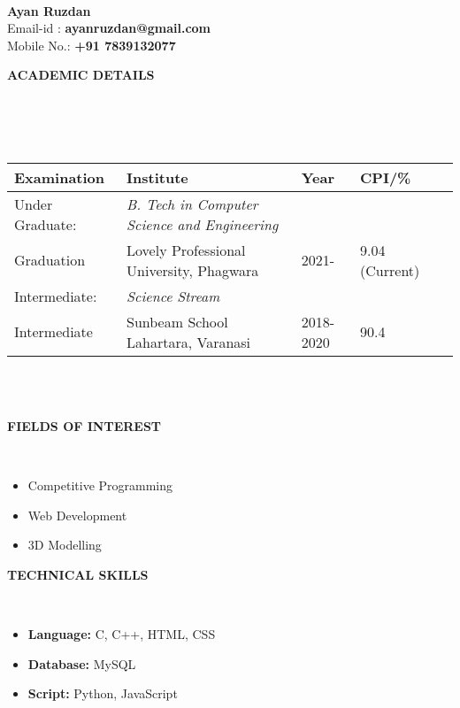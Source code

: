 \documentclass[a4paper,10pt]{article}
\newcommand{\lsep}{-0.5cm}
\newcommand{\resheading}[1]{{\small \colorbox{mygrey}{\begin{minipage}{0.975\textwidth}{\textbf{#1 \vphantom{p\^{E}}}}\end{minipage}}}}
\begin{document}
\hspace{0.5cm}\\[-0.2cm]

\textbf{Ayan Ruzdan} \\
\indent Email-id : \textbf{ayanruzdan@gmail.com} \\
\indent Mobile No.: \textbf{+91 7839132077} \\

\resheading{\textbf{ACADEMIC DETAILS} }\\[\lsep]
\\ \\
\indent \begin{tabular}{ l @{\hskip 0.15in} l @{\hskip 0.15in} l @{\hskip 0.15in} l @{\hskip 0.15in} l }
  \hline
  \textbf{Examination} & \textbf{Institute}                       & \textbf{Year} & \textbf{CPI/\%} \\
  \hline
  Under Graduate:\,\,  & \textit{B. Tech in Computer Science and Engineering}                                   \\
  Graduation           & Lovely Professional University, Phagwara  & 2021-       & 9.04 (Current)  \\
  Intermediate:        & \textit{Science Stream}                                                     \\
  Intermediate         & Sunbeam School Lahartara, Varanasi        & 2018-2020          & 90.4            \\
  \hline
\end{tabular}
\\ \\

\resheading{\textbf{FIELDS OF INTEREST} }\\[\lsep]
\begin{itemize}
  \item Competitive Programming
  \item Web Development
  \item 3D Modelling
\end{itemize}

\resheading{\textbf{TECHNICAL SKILLS} }\\[\lsep]
\begin{itemize}
  \item \noindent \textbf{Language:} C, C++, HTML, CSS
  \item \textbf{Database:} MySQL
  \item \textbf{Script:} Python, JavaScript
\end{itemize}
\end{document}
